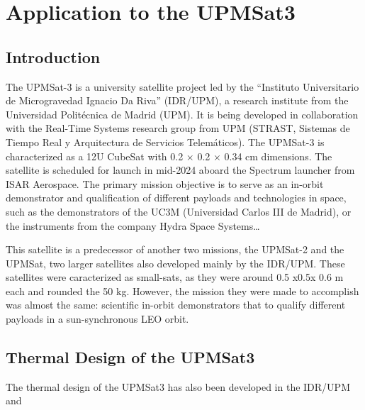 \chapter{Application to the UPMSat3}
\section{Introduction}

The UPMSat-3 is a university satellite project led by the “Instituto Universitario de Microgravedad  Ignacio Da Riva” (IDR/UPM), a research institute from the Universidad Politécnica de Madrid (UPM). It is being developed in collaboration with the Real-Time Systems research group from UPM (STRAST, Sistemas de Tiempo Real y Arquitectura de Servicios Telemáticos). The UPMSat-3 is characterized as a 12U CubeSat with 0.2 × 0.2 × 0.34 cm dimensions. The satellite is scheduled for launch in mid-2024 aboard the Spectrum launcher from ISAR Aerospace. 
The primary mission objective is to serve as an in-orbit demonstrator and qualification of
different payloads and technologies in space, such as the demonstrators of the UC3M (Universidad Carlos III de Madrid), or the instruments from the company Hydra Space Systems\dots

This satellite is a predecessor of another two missions, the UPMSat-2 and the UPMSat, two larger satellites also developed mainly by the IDR/UPM. These satellites were caracterized as small-sats, as they were around 0.5 x0.5x 0.6 m each and rounded the 50 kg. However, the mission they were made to accomplish was almost the same: scientific in-orbit demonstrators that to qualify different payloads in a sun-synchronous LEO orbit.


\section{Thermal Design of the UPMSat3}
The thermal design of the UPMSat3 has also been developed in the IDR/UPM and 